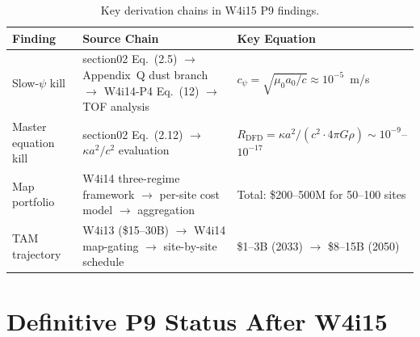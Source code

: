 \documentclass[11pt]{article}
\theoremstyle{definition}
\theoremstyle{remark}
\begin{document}
\begin{table}[H]
\centering
\caption{Key derivation chains in W4i15 P9 findings.}
\label{tab:derivation-chains}
\begin{tabular}{@{}p{3cm}p{4cm}p{5cm}@{}}
\toprule
Finding & Source Chain & Key Equation \\
\midrule
Slow-$\psi$ kill &
  section02 Eq.~(2.5) $\to$ Appendix~Q dust branch $\to$
  W4i14-P4 Eq.~(12) $\to$ TOF analysis &
  $c_\psi = \sqrt{\mu_0 a_0/c} \approx 10^{-5}$~m/s \\
Master equation kill &
  section02 Eq.~(2.12) $\to$ $\kappa a^2/c^2$ evaluation &
  $R_{\mathrm{DFD}} = \kappa a^2/(c^2 \cdot 4\pi G\rho)
  \sim 10^{-9}$--$10^{-17}$ \\
Map portfolio &
  W4i14 three-regime framework $\to$ per-site cost model $\to$
  aggregation &
  Total: \$200--500M for 50--100 sites \\
TAM trajectory &
  W4i13 (\$15--30B) $\to$ W4i14 map-gating $\to$ site-by-site
  schedule &
  \$1--3B (2033) $\to$ \$8--15B (2050) \\
\bottomrule
\end{tabular}
\end{table}

\section{Definitive P9 Status After W4i15}
\label{sec:status-w4i15}
\end{document}

